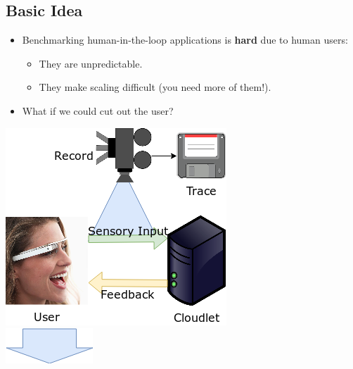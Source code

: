 \documentclass[portrait, a1]{KTHEEposter}
\begin{document}
\begin{pcolumns}[3]
\begin{pcolumn}[2]
\begin{pframe}[1.3]
                \section{Basic Idea}
                \begin{itemize}
                    \item Benchmarking human-in-the-loop applications is \textbf{hard} due to human users:
                    \begin{itemize}
                        \item They are unpredictable.
                        \item They make scaling difficult (you need more of them!).
                    \end{itemize}
                    \item What if we could cut out the user?
                \end{itemize}
                \medskip
                \begin{center}
                    \medskip
                    \includegraphics[width=.75\linewidth]{img/trace_idea_1}\\
                    \medskip
                    \includegraphics{img/trace_idea_arrow}\\
                    \medskip

\end{center}
\end{pframe}
\end{pcolumn}
\end{pcolumns}
\end{document}
